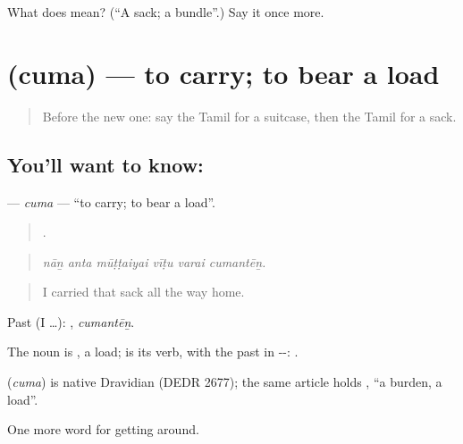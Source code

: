 \begin{tcolorbox}[breakable,colback=teal!4,colframe=teal!35!black,title={Before you move on}]
What does  mean? (\textquotedblleft{}A sack; a bundle\textquotedblright{}.) Say it once more.
\end{tcolorbox}
\section[\texorpdfstring{\ta{சும} (cuma)}{சும (cuma)}]{ (cuma) — to carry; to bear a load}

\label{lesson:TA-C402-cuma}



\begin{quote}
Before the new one: say the Tamil for a suitcase, then the Tamil for a sack.
\end{quote}

\subsection*{You'll want to know: }
\textbf{} — \emph{cuma} — \textquotedblleft{}to carry; to bear a load\textquotedblright{}.

\begin{quote}
     .
\end{quote}

\begin{quote}
\emph{nāṉ anta mūṭṭaiyai vīṭu varai cumantēṉ.}
\end{quote}

\begin{quote}
I carried that sack all the way home.
\end{quote}

Past (I …): , \emph{cumantēṉ}.

The noun is , a load;  is its verb, with the past in --: .

\begin{cousinweb}
\textbf{} (\emph{cuma}) is native Dravidian (DEDR 2677); the same article holds , \textquotedblleft{}a burden, a load\textquotedblright{}.
\end{cousinweb}

\begin{grammarlens}[title={What you've built}]
One more word for getting around.
\end{grammarlens}

